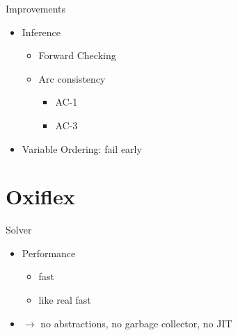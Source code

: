 \documentclass[mathserif,table]{gkibeamer-aaai}
\begin{document}
\begin{frame}{Improvements}
	\begin{itemize}
		\item Inference
		      \pause
		      \begin{itemize}
			      \item Forward Checking
			            \pause
			      \item Arc consistency
			            \pause
			            \begin{itemize}
				            \item AC-1
				                  \pause
				            \item AC-3
			            \end{itemize}
			            \pause
		      \end{itemize}
		\item Variable Ordering: fail early
	\end{itemize}
\end{frame}

\section{Oxiflex}

\begin{frame}
\end{frame}

\begin{frame}
\end{frame}

\begin{frame}{Solver}
	\begin{itemize}
		\item Performance
		      \pause
		      \begin{itemize}
			      \item fast
			            \pause
			      \item like real fast
			            \pause
		      \end{itemize}
		\item $\rightarrow$ no abstractions, no garbage collector, no JIT
	\end{itemize}
\end{frame}
\end{document}
